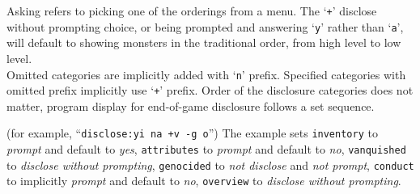 Asking refers to picking one of the orderings from a menu.
The `{\tt +}' disclose without prompting choice,
or being prompted and answering `{\tt y}' rather than `{\tt a}',
will default to showing monsters in the traditional order,
from high level to low level.\\
Omitted categories are implicitly added with `{\tt n}' prefix.
Specified categories with omitted prefix implicitly use `{\tt +}' prefix.
Order of the disclosure categories does not matter, program display for
end-of-game disclosure follows a set sequence.

(for example, ``{\tt disclose:yi na +v -g o}'')
The example sets
{\tt inventory} to {\it prompt\/} and default to {\it yes\/},
{\tt attributes} to {\it prompt\/} and default to {\it no\/},
{\tt vanquished} to {\it disclose without prompting\/},
{\tt genocided} to {\it not disclose\/} and {\it not prompt\/},
{\tt conduct} to implicitly {\it prompt\/} and default to {\it no\/},
{\tt overview} to {\it disclose without prompting\/}.

